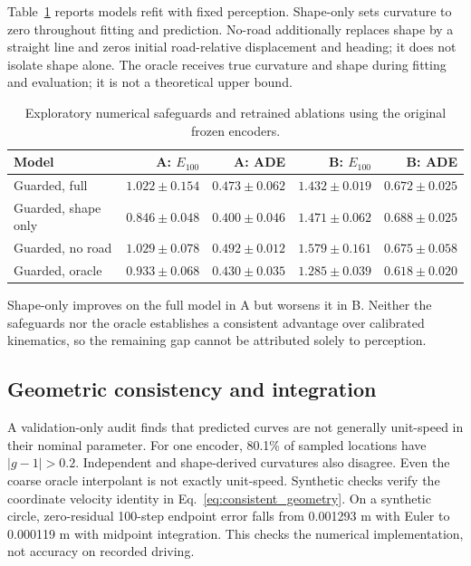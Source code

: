 \documentclass[preprint,12pt]{elsarticle}
\begin{document}
Table~\ref{tab:guards} reports models refit with fixed perception. Shape-only
sets curvature to zero throughout fitting and prediction. No-road additionally
replaces shape by a straight line and zeros initial road-relative displacement
and heading; it does not isolate shape alone. The oracle receives true curvature
and shape during fitting and evaluation; it is not a theoretical upper bound.
\begin{table}[t]
\centering
\caption{Exploratory numerical safeguards and retrained ablations using the original frozen encoders.}
\label{tab:guards}
\footnotesize
\setlength{\tabcolsep}{3pt}
\begin{tabular}{lrrrr}
\toprule
Model & A: $E_{100}$ & A: ADE & B: $E_{100}$ & B: ADE \\
\midrule
Guarded, full & $1.022 \pm 0.154$ & $0.473 \pm 0.062$ & $1.432 \pm 0.019$ & $0.672 \pm 0.025$ \\
Guarded, shape only & $0.846 \pm 0.048$ & $0.400 \pm 0.046$ & $1.471 \pm 0.062$ & $0.688 \pm 0.025$ \\
Guarded, no road & $1.029 \pm 0.078$ & $0.492 \pm 0.012$ & $1.579 \pm 0.161$ & $0.675 \pm 0.058$ \\
Guarded, oracle & $0.933 \pm 0.068$ & $0.430 \pm 0.035$ & $1.285 \pm 0.039$ & $0.618 \pm 0.020$ \\
\bottomrule
\end{tabular}
\end{table}

Shape-only improves on the full model in A but worsens it in B. Neither the
safeguards nor the oracle establishes a consistent advantage over calibrated
kinematics, so the remaining gap cannot be attributed solely to perception.

\subsection{Geometric consistency and integration}
A validation-only audit finds that predicted curves are not generally unit-speed
in their nominal parameter. For one encoder, 80.1\% of sampled locations have
$|g-1|>0.2$. Independent and shape-derived curvatures also disagree. Even the
coarse oracle interpolant is not exactly unit-speed. Synthetic checks verify
the coordinate velocity identity in Eq.~\eqref{eq:consistent_geometry}.
On a synthetic circle, zero-residual 100-step endpoint error falls from
0.001293 m with Euler to 0.000119 m with midpoint integration. This checks the
numerical implementation, not accuracy on recorded driving.
\end{document}
